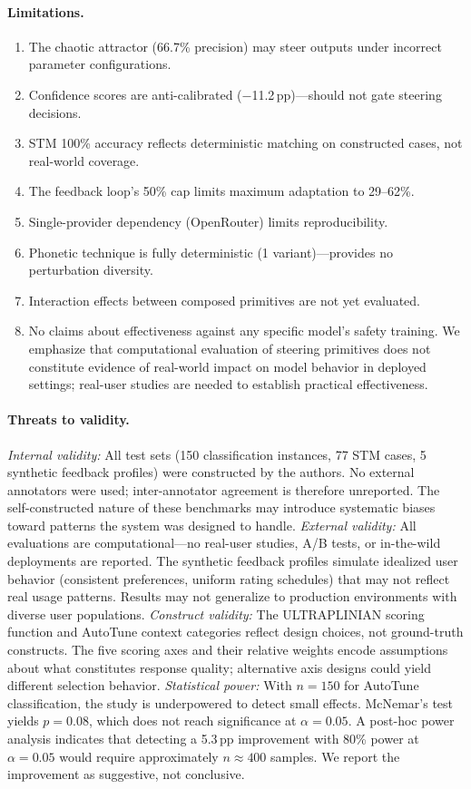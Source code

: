 \documentclass[11pt]{article}
\begin{document}
\paragraph{Limitations.}
\begin{enumerate}
    \item The chaotic attractor (66.7\% precision) may steer outputs under incorrect parameter configurations.
    \item Confidence scores are anti-calibrated ($-$11.2\,pp)---should not gate steering decisions.
    \item STM 100\% accuracy reflects deterministic matching on constructed cases, not real-world coverage.
    \item The feedback loop's 50\% cap limits maximum adaptation to 29--62\%.
    \item Single-provider dependency (OpenRouter) limits reproducibility.
    \item Phonetic technique is fully deterministic (1 variant)---provides no perturbation diversity.
    \item Interaction effects between composed primitives are not yet evaluated.
    \item No claims about effectiveness against any specific model's safety training. We emphasize that computational evaluation of steering primitives does not constitute evidence of real-world impact on model behavior in deployed settings; real-user studies are needed to establish practical effectiveness.
\end{enumerate}

\paragraph{Threats to validity.}
\emph{Internal validity:} All test sets (150 classification instances, 77 STM cases, 5 synthetic feedback profiles) were constructed by the authors. No external annotators were used; inter-annotator agreement is therefore unreported. The self-constructed nature of these benchmarks may introduce systematic biases toward patterns the system was designed to handle.
\emph{External validity:} All evaluations are computational---no real-user studies, A/B tests, or in-the-wild deployments are reported. The synthetic feedback profiles simulate idealized user behavior (consistent preferences, uniform rating schedules) that may not reflect real usage patterns. Results may not generalize to production environments with diverse user populations.
\emph{Construct validity:} The ULTRAPLINIAN scoring function and AutoTune context categories reflect design choices, not ground-truth constructs. The five scoring axes and their relative weights encode assumptions about what constitutes response quality; alternative axis designs could yield different selection behavior.
\emph{Statistical power:} With $n=150$ for AutoTune classification, the study is underpowered to detect small effects. McNemar's test yields $p=0.08$, which does not reach significance at $\alpha=0.05$. A post-hoc power analysis indicates that detecting a 5.3\,pp improvement with 80\% power at $\alpha=0.05$ would require approximately $n \approx 400$ samples. We report the improvement as suggestive, not conclusive.
\end{document}
